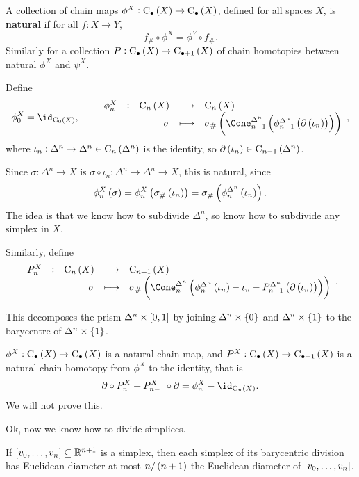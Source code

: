 \begin{definition*}
A collection of chain maps $ \phi^X : \C_\bullet\br{X} \to \C_\bullet\br{X} $, defined for all spaces $ X $, is \textbf{natural} if for all $ f : X \to Y $,
$$ f_\# \circ \phi^X = \phi^Y \circ f_\#. $$
Similarly for a collection $ P : \C_\bullet\br{X} \to \C_{\bullet + 1}\br{X} $ of chain homotopies between natural $ \phi^X $ and $ \psi^X $.
\end{definition*}

\pagebreak

\begin{definition*}
Define
$$ \phi_0^X = \id_{\C_0\br{X}}, \qquad \function[\phi_n^X]{\C_n\br{X}}{\C_n\br{X}}{\sigma}{\sigma_\#\br{\Cone_{n - 1}^{\Delta^n}\br{\phi_{n - 1}^{\Delta^n}\br{\da\br{\iota_n}}}}}, $$
where $ \iota_n : \Delta^n \to \Delta^n \in \C_n\br{\Delta^n} $ is the identity, so $ \da\br{\iota_n} \in \C_{n - 1}\br{\Delta^n} $.
\end{definition*}

Since $ \sigma : \Delta^n \to X $ is $ \sigma \circ \iota_n : \Delta^n \to \Delta^n \to X $, this is natural, since
$$ \phi_n^X\br{\sigma} = \phi_n^X\br{\sigma_\#\br{\iota_n}} = \sigma_\#\br{\phi_n^{\Delta^n}\br{\iota_n}}. $$
The idea is that we know how to subdivide $ \Delta^n $, so know how to subdivide any simplex in $ X $.

\begin{definition*}
Similarly, define
$$ \function[P_n^X]{\C_n\br{X}}{\C_{n + 1}\br{X}}{\sigma}{\sigma_\#\br{\Cone_n^{\Delta^n}\br{\phi_n^{\Delta^n}\br{\iota_n} - \iota_n - P_{n - 1}^{\Delta^n}\br{\da\br{\iota_n}}}}}. $$
\end{definition*}

This decomposes the prism $ \Delta^n \times \sbr{0, 1} $ by joining $ \Delta^n \times \cbr{0} $ and $ \Delta^n \times \cbr{1} $ to the barycentre of $ \Delta^n \times \cbr{1} $.

\begin{fact*}
$ \phi^X : \C_\bullet\br{X} \to \C_\bullet\br{X} $ is a natural chain map, and $ P^X : \C_\bullet\br{X} \to \C_{\bullet + 1}\br{X} $ is a natural chain homotopy from $ \phi^X $ to the identity, that is
$$ \da \circ P_n^X + P_{n - 1}^X \circ \da = \phi_n^X - \id_{\C_n\br{X}}. $$
We will not prove this.
\end{fact*}

Ok, now we know how to divide simplices.

\begin{lemma}
If $ \sbr{v_0, \dots, v_n} \subseteq \RR^{n + 1} $ is a simplex, then each simplex of its barycentric division has Euclidean diameter at most $ n / \br{n + 1} $ the Euclidean diameter of $ \sbr{v_0, \dots, v_n} $.
\end{lemma}

